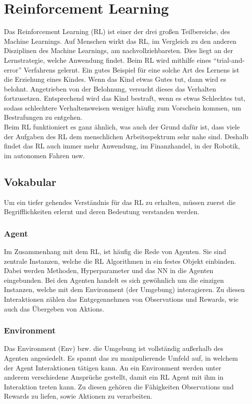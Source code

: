\section{Reinforcement Learning} \label{sec:Grundlagen_RL}
Das Reinforcement Learning (RL) ist einer der drei großen Teilbereiche, des Machine Learnings.
Auf Menschen wirkt das RL, im Vergleich zu den anderen Disziplinen des Machine Learnings, am nachvollziehbarsten.
Dies liegt an der Lernstrategie, welche Anwendung findet. 
Beim RL wird mithilfe eines "`trial-and-error"' Verfahrens gelernt. Ein gutes Beispiel für eine solche Art des Lernens ist die Erziehung eines Kindes. Wenn das Kind etwas Gutes tut, dann wird es belohnt. Angetrieben von der Belohnung, versucht dieses das Verhalten fortzusetzen. 
Entsprechend wird das Kind bestraft, wenn es etwas Schlechtes tut, sodass schlechtere Verhaltensweisen weniger häufig zum Vorschein kommen, um Bestrafungen zu entgehen. \citep[S.1 ff.]{Sutton1998}\\
Beim RL funktioniert es ganz ähnlich, was auch der Grund dafür ist, dass viele der Aufgaben des RL dem menschlichen Arbeitsspektrum sehr nahe sind. 
Deshalb findet das RL auch immer mehr Anwendung, im Finanzhandel, in der Robotik, im autonomen Fahren usw. \citep[Kapitel 18]{DRL_Lapan}

\subsection{Vokabular} \label{subsec:Grundlagen_Vokabular}
Um ein tiefer gehendes Verständnis für das RL zu erhalten, müssen zuerst die Begrifflichkeiten erlernt und deren Bedeutung verstanden werden.

\subsubsection{Agent} \label{subsubsec:Grundlagen_Agent}
Im Zusammenhang mit dem RL, ist häufig die Rede von Agenten. Sie sind zentrale Instanzen, welche die RL Algorithmen in ein festes Objekt einbinden. Dabei werden Methoden, Hyperparameter und das NN in die Agenten eingebunden. \citep[S. 31]{DRL_Lapan}
Bei den Agenten handelt es sich gewöhnlich um die einzigen Instanzen, welche mit dem Environment (der Umgebung) interagieren. Zu diesen Interaktionen zählen das Entgegennehmen von Observations und Rewards, wie auch das Übergeben von Aktions. \citep[S. 2ff.]{Sutton1998}

\subsubsection{Environment} \label{subsubsec:Grundlagen_Environment}
Das Environment (Env) bzw. die  Umgebung ist vollständig außerhalb des Agenten angesiedelt. Es spannt das zu manipulierende Umfeld auf, in welchem der Agent Interaktionen tätigen kann. An ein Environment werden unter anderem verschiedene Ansprüche gestellt, damit ein RL Agent mit ihm in Interaktion treten kann. Zu diesen gehören die Fähigkeiten Observations und Rewards zu liefen, sowie Aktionen zu verarbeiten. \citep[S. 31 \& S.2 ff.]{DRL_Lapan, Sutton1998}

